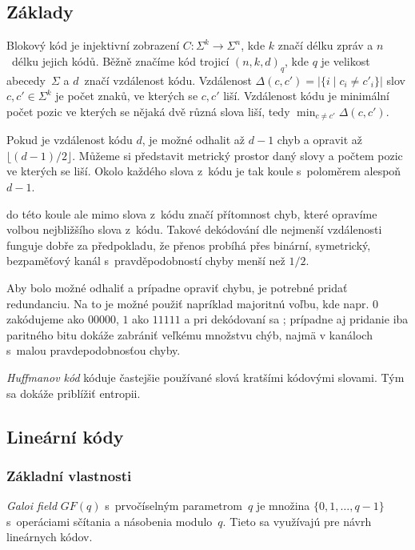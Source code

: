 \subsection{Základy}

Blokový kód je injektivní zobrazení $C : \Sigma^k \to \Sigma^n$,
kde $k$ značí délku zpráv a $n$~délku jejich kódů.
Běžně značíme kód trojicí $(n,k,d)_q$, kde $q$ je velikost 
abecedy~$\Sigma$ a $d$~značí vzdálenost kódu. Vzdálenost
$\Delta(c, c') = \lvert \{ i \mid c_i \neq c'_i \} \rvert$
slov $c, c' \in \Sigma^k$ je počet znaků, ve kterých se $c, c'$
liší. Vzdálenost kódu je minimální počet pozic ve kterých se nějaká dvě
různá slova liší, tedy $\min_{c \neq c'} \Delta(c, c')$.

Pokud je vzdálenost kódu $d$, je možné odhalit až $d-1$ chyb
a opravit až $\lfloor (d-1) / 2 \rfloor$.
Můžeme si představit metrický prostor daný slovy a počtem pozic ve
kterých se liší. Okolo každého slova z~kódu je tak koule s~poloměrem
alespoň $d-1$.

 do této koule ale mimo slova z~kódu značí
přítomnost chyb, které opravíme volbou nejbližšího slova z~kódu. Takové
dekódování dle nejmenší vzdálenosti funguje dobře za předpokladu, že
přenos probíhá přes binární, symetrický, bezpaměťový kanál
s~pravděpodobností chyby menší než $1/2$.

Aby bolo možné odhaliť a prípadne opraviť chybu, je potrebné pridať redundanciu.
Na to je možné použiť napríklad majoritnú voľbu, kde napr. $0$ zakódujeme
ako $00000$, $1$ ako $11111$ a pri dekódovaní sa ; prípadne
aj pridanie iba paritného bitu dokáže zabrániť veľkému množstvu chýb,
najmä v kanáloch s~malou pravdepodobnosťou chyby.

{\em Huffmanov kód} kóduje častejšie používané slová kratšími kódovými slovami.
Tým sa dokáže priblížiť entropii.

\subsection{Lineární kódy}

\subsubsection{Základní vlastnosti}


{\em Galoi field} $GF(q)$ s~prvočíselným parametrom~$q$ je množina $\{0,1,\ldots, q-1 \}$
s~operáciami sčítania a násobenia modulo~$q$. Tieto sa využívajú pre návrh
lineárnych kódov.

